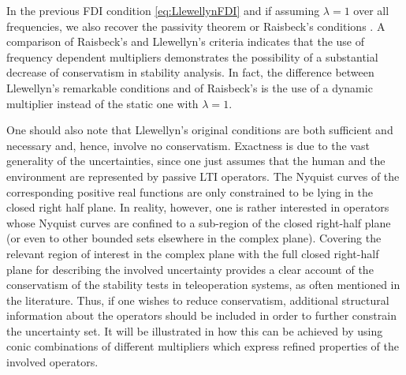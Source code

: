 \begin{rem} In the previous FDI condition \eqref{eq:LlewellynFDI} and if assuming $\lambda = 1$ over all frequencies, we also recover the passivity theorem or Raisbeck's conditions \cite{raisbeck}. {A} comparison of Raisbeck's and Llewellyn's criteria indicates that the use of frequency dependent multipliers demonstrates the possibility of a substantial decrease of conservatism in stability analysis. In fact, the difference between Llewellyn's remarkable conditions and of Raisbeck's is {the use of a dynamic multiplier  instead of the static one with $\lambda=1$}.
\end{rem}
\begin{rem} One should also note that Llewellyn's original conditions are both sufficient and necessary {and, hence, involve} no conservatism. {Exactness is due to the vast generality of the uncertainties, since one just assumes that the human and the environment are  represented by passive LTI operators. The Nyquist curves of the corresponding positive real functions are only constrained {to be} lying in the closed right half plane. In reality, however, one is rather interested in operators whose Nyquist curves are confined to a sub-region of the closed right-half plane (or even to other bounded sets elsewhere in the complex plane).} {Covering the relevant region of interest in the complex plane with the full closed right-half plane for describing the involved uncertainty provides a clear account of the conservatism of the stability tests in teleoperation systems, as often mentioned in the literature.} Thus, if one wishes to reduce conservatism, additional structural information about the operators should be included {in order} to further constrain the uncertainty set. {It will be illustrated in  how this can be achieved by using conic combinations of different multipliers which express refined properties of the involved operators.}
\end{rem}

